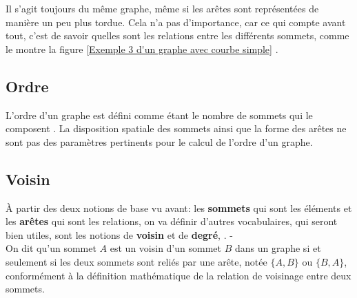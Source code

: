 \documentclass[hidelinks,letterpaper,12pt]{article}
\newcounter{Exemple} %
\begin{document}
Il s'agit toujours du même graphe, même si les arêtes sont représentées de manière un peu plus tordue. Cela n'a pas d'importance, car ce qui compte avant tout, c'est de savoir quelles sont les relations entre les différents sommets, comme le montre la figure \ref{Exemple 3 d'un graphe avec courbe simple} \citep{ChristianLaforest}.
\bigbreak 
\subsection{Ordre}
\label{Ordre}
L'ordre d'un graphe est défini comme étant le nombre de sommets qui le composent \citep{PortieMenyr}. La disposition spatiale des sommets ainsi que la forme des arêtes ne sont pas des paramètres pertinents pour le calcul de l'ordre d'un graphe.

\bigbreak  
\subsection{Voisin}
\label{Voisin}
À partir des deux notions de base vu avant: les \textbf{sommets} qui sont les éléments et les \textbf{arêtes} qui sont les relations, on va définir d’autres vocabulaires, qui seront bien utiles, sont les notions de \textbf{voisin} et de \textbf{degré}, \citep{ChristianLaforest}.
{\color{white}-}\\ %
On dit qu'un sommet $A$ est un voisin d'un sommet $B$ dans un graphe si et seulement si les deux sommets sont reliés par une arête, notée $\{A,B\}$ ou $\{B,A\}$, conformément à la définition mathématique de la relation de voisinage entre deux sommets.
\bigbreak
\end{document}
